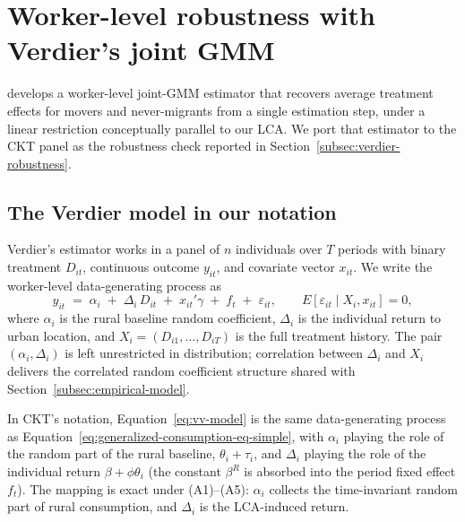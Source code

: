 %
%

\section{Worker-level robustness with Verdier's joint GMM}\label{app:verdier-robustness}

\citet{verdierAverageTreatmentEffects2020a} develops a worker-level joint-GMM estimator that recovers average treatment effects for movers and never-migrants from a single estimation step, under a linear restriction conceptually parallel to our LCA.
We port that estimator to the CKT panel as the robustness check reported in Section~\ref{subsec:verdier-robustness}.

\subsection{The Verdier model in our notation}\label{app:vv-rob-model}

Verdier's estimator works in a panel of $n$ individuals over $T$ periods with binary treatment $D_{it}$, continuous outcome $y_{it}$, and covariate vector $x_{it}$.
We write the worker-level data-generating process as
\begin{equation}\label{eq:vv-model}
y_{it} \;=\; \alpha_i \;+\; \Delta_i\,D_{it} \;+\; x_{it}'\gamma \;+\; f_t \;+\; \varepsilon_{it},
\qquad E\!\left[\varepsilon_{it} \mid X_i, x_{it}\right] = 0,
\end{equation}
where $\alpha_i$ is the rural baseline random coefficient, $\Delta_i$ is the individual return to urban location, and $X_i = (D_{i1},\dots,D_{iT})$ is the full treatment history.
The pair $(\alpha_i, \Delta_i)$ is left unrestricted in distribution; correlation between $\Delta_i$ and $X_i$ delivers the correlated random coefficient structure shared with Section~\ref{subsec:empirical-model}.

In CKT's notation, Equation~\eqref{eq:vv-model} is the same data-generating process as Equation~\eqref{eq:generalized-consumption-eq-simple}, with $\alpha_i$ playing the role of the random part of the rural baseline, $\theta_i + \tau_i$, and $\Delta_i$ playing the role of the individual return $\beta + \phi\theta_i$ (the constant $\beta^R$ is absorbed into the period fixed effect $f_t$).
The mapping is exact under (A1)--(A5): $\alpha_i$ collects the time-invariant random part of rural consumption, and $\Delta_i$ is the LCA-induced return.

